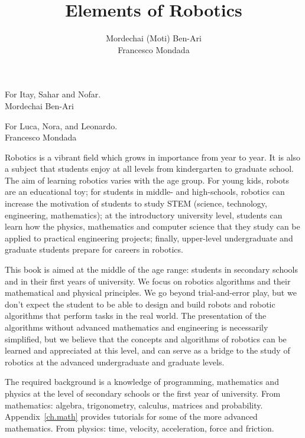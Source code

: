 
\author{Mordechai (Moti) Ben-Ari\\Francesco Mondada}
\title{Elements of Robotics}
\maketitle

\frontmatter%

\begin{dedication}
For Itay, Sahar and Nofar.\\
Mordechai Ben-Ari

\bigskip

For Luca, Nora, and Leonardo.\\
Francesco Mondada
\end{dedication}

\preface


Robotics is a vibrant field which grows in importance from year to year. It is also a subject that students enjoy at all levels from kindergarten to graduate school. The aim of learning robotics varies with the age group. For young kids, robots are an educational toy;  for students in middle- and high-schools, robotics can increase the motivation of students to study STEM (science, technology, engineering, mathematics); at the introductory university level, students can learn how the physics, mathematics and computer science that they study can be applied to practical engineering projects; finally, upper-level undergraduate and graduate students prepare for careers in robotics.

This book is aimed at the middle of the age range: students in secondary schools and in their first years of university. We focus on robotics algorithms and their mathematical and physical principles. We go beyond trial-and-error play, but we don't expect the student to be able to design and build robots and robotic algorithms that perform tasks in the real world. The presentation of the algorithms without advanced mathematics and engineering is necessarily simplified, but we believe that the concepts and algorithms of robotics can be learned and appreciated at this level, and can serve as a bridge to the study of robotics at the advanced undergraduate and graduate levels.

The required background is a knowledge of programming, mathematics and physics at the level of secondary schools or the first year of university. From mathematics: algebra, trigonometry, calculus, matrices and probability. Appendix~\ref{ch.math} provides tutorials for some of the more advanced mathematics. From physics: time, velocity, acceleration, force and friction.

